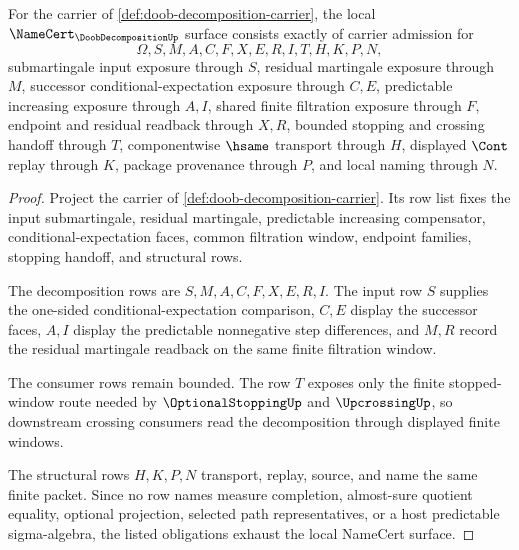 \begin{theorem}
\label{thm:doob-decomposition-namecert-obligations}
For the carrier of \autoref{def:doob-decomposition-carrier}, the local $\NameCert_{\DoobDecompositionUp}$ surface consists exactly of carrier admission for
$$
\Omega,S,M,A,C,F,X,E,R,I,T,H,K,P,N,
$$
submartingale input exposure through $S$, residual martingale exposure through $M$, successor conditional-expectation exposure through $C,E$, predictable increasing exposure through $A,I$, shared finite filtration exposure through $F$, endpoint and residual readback through $X,R$, bounded stopping and crossing handoff through $T$, componentwise $\hsame$ transport through $H$, displayed $\Cont$ replay through $K$, package provenance through $P$, and local naming through $N$.
\end{theorem}
\begin{proof}
Project the carrier of \autoref{def:doob-decomposition-carrier}. Its row list fixes the input submartingale, residual martingale, predictable increasing compensator, conditional-expectation faces, common filtration window, endpoint families, stopping handoff, and structural rows.

The decomposition rows are $S,M,A,C,F,X,E,R,I$. The input row $S$ supplies the one-sided conditional-expectation comparison, $C,E$ display the successor faces, $A,I$ display the predictable nonnegative step differences, and $M,R$ record the residual martingale readback on the same finite filtration window.

The consumer rows remain bounded. The row $T$ exposes only the finite stopped-window route needed by $\OptionalStoppingUp$ and $\UpcrossingUp$, so downstream crossing consumers read the decomposition through displayed finite windows.

The structural rows $H,K,P,N$ transport, replay, source, and name the same finite packet. Since no row names measure completion, almost-sure quotient equality, optional projection, selected path representatives, or a host predictable sigma-algebra, the listed obligations exhaust the local NameCert surface.
\end{proof}


